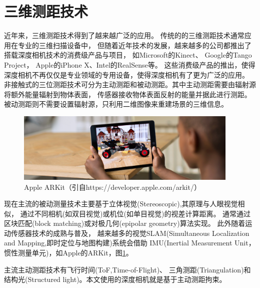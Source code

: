 \section{三维测距技术}\label{range_finding}
近年来，三维测距技术得到了越来越广泛的应用。
传统的的三维测距技术通常应用在专业的三维扫描设备中，
但随着近年技术的发展，越来越多的公司都推出了搭载深度相机技术的消费级产品与项目，
如Microsoft的Kinect\cite{microsoft_kinect}、
Google的Tango\cite{google_tango} Project，
Apple的iPhone X\cite{apple_iphoneX}、Intel的RealSense\cite{intel_realsense}等。
这些消费级产品的推出，使得深度相机不再仅仅是专业领域的专用设备，使得深度相机有了更为广泛的应用。
非接触式的三位测距技术可分为主动测距和被动测距。其中主动测距需要由辐射源将额外能量辐射到物体表面，
传感器接收物体表面反射的能量并据此进行测距。被动测距则不需要设置辐射源，只利用二维图像来重建场景的三维信息。
\begin{figure}[h]
    \centering
    \includegraphics[width=0.95\textwidth]{./Pictures/ARKit.eps}
    \caption{Apple ARKit（引自https://developer.apple.com/arkit/）}
    \label{arkit}
\end{figure}

现在主流的被动测量技术主要基于立体视觉(Stereoscopic),其原理与人眼视觉相似，
通过不同相机(如双目视觉)或机位(如单目视觉)的视差计算距离。
通常通过区块匹配(block matching)或对极几何(epipolar geometry)算法实现。
此外随着运动传感器技术的成熟与普及，
越来越多的视觉SLAM(Simultaneous Localization and Mapping,即时定位与地图构建)系统会借助
IMU(Inertial Measurement Unit，惯性测量单元)，如Apple的ARKit\cite{apple_arkit}，图\ref{arkit}。

主流主动测距技术有飞行时间(ToF,Time-of-Flight)、
三角测距(Triangulation)和结构光(Structured light)。本文使用的深度相机就是基于主动测距拘束。
